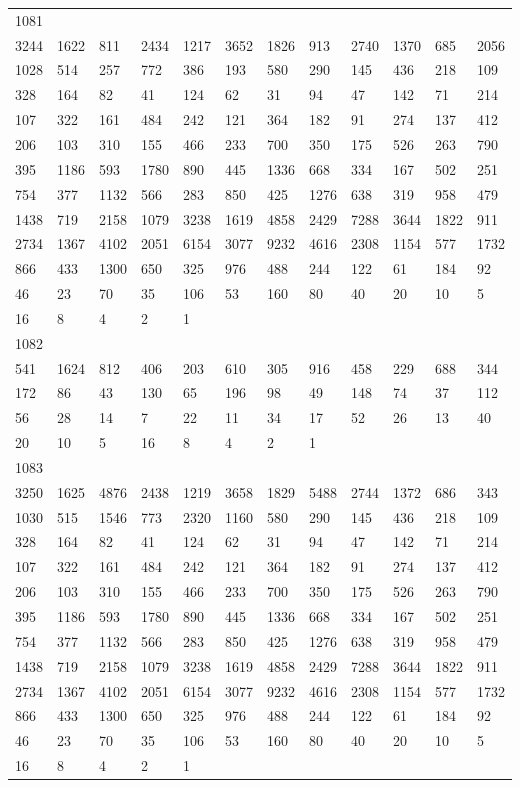 \begin{longtable}{llllllllllll}
1081&&&&&&&&&&&\\
3244& 1622& 811& 2434& 1217& 3652& 1826& 913& 2740& 1370& 685& 2056\\
1028& 514& 257& 772& 386& 193& 580& 290& 145& 436& 218& 109\\
328& 164& 82& 41& 124& 62& 31& 94& 47& 142& 71& 214\\
107& 322& 161& 484& 242& 121& 364& 182& 91& 274& 137& 412\\
206& 103& 310& 155& 466& 233& 700& 350& 175& 526& 263& 790\\
395& 1186& 593& 1780& 890& 445& 1336& 668& 334& 167& 502& 251\\
754& 377& 1132& 566& 283& 850& 425& 1276& 638& 319& 958& 479\\
1438& 719& 2158& 1079& 3238& 1619& 4858& 2429& 7288& 3644& 1822& 911\\
2734& 1367& 4102& 2051& 6154& 3077& 9232& 4616& 2308& 1154& 577& 1732\\
866& 433& 1300& 650& 325& 976& 488& 244& 122& 61& 184& 92\\
46& 23& 70& 35& 106& 53& 160& 80& 40& 20& 10& 5\\
16& 8& 4& 2& 1& \\

1082&&&&&&&&&&&\\
541& 1624& 812& 406& 203& 610& 305& 916& 458& 229& 688& 344\\
172& 86& 43& 130& 65& 196& 98& 49& 148& 74& 37& 112\\
56& 28& 14& 7& 22& 11& 34& 17& 52& 26& 13& 40\\
20& 10& 5& 16& 8& 4& 2& 1& \\

1083&&&&&&&&&&&\\
3250& 1625& 4876& 2438& 1219& 3658& 1829& 5488& 2744& 1372& 686& 343\\
1030& 515& 1546& 773& 2320& 1160& 580& 290& 145& 436& 218& 109\\
328& 164& 82& 41& 124& 62& 31& 94& 47& 142& 71& 214\\
107& 322& 161& 484& 242& 121& 364& 182& 91& 274& 137& 412\\
206& 103& 310& 155& 466& 233& 700& 350& 175& 526& 263& 790\\
395& 1186& 593& 1780& 890& 445& 1336& 668& 334& 167& 502& 251\\
754& 377& 1132& 566& 283& 850& 425& 1276& 638& 319& 958& 479\\
1438& 719& 2158& 1079& 3238& 1619& 4858& 2429& 7288& 3644& 1822& 911\\
2734& 1367& 4102& 2051& 6154& 3077& 9232& 4616& 2308& 1154& 577& 1732\\
866& 433& 1300& 650& 325& 976& 488& 244& 122& 61& 184& 92\\
46& 23& 70& 35& 106& 53& 160& 80& 40& 20& 10& 5\\
16& 8& 4& 2& 1& \\


\end{longtable}
